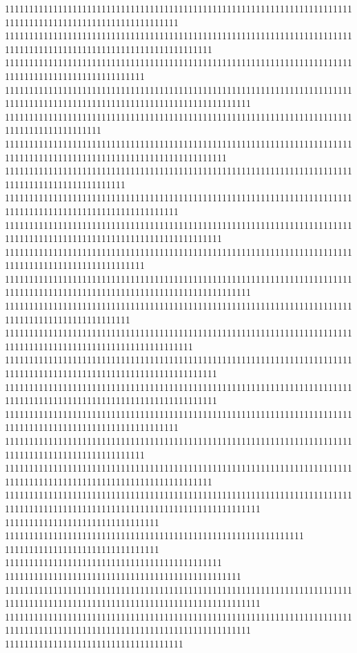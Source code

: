 111111111111111111111111111111111111111111111111111111111111111111111111111111111111111111111111111111111111
1111111111111111111111111111111111111111111111111111111111111111111111111111111111111111111111111111111111111111111
11111111111111111111111111111111111111111111111111111111111111111111111111111111111111111111111111111
111111111111111111111111111111111111111111111111111111111111111111111111111111111111111111111111111111111111111111111111111
11111111111111111111111111111111111111111111111111111111111111111111111111111111111111111111
1111111111111111111111111111111111111111111111111111111111111111111111111111111111111111111111111111111111111111111111
1111111111111111111111111111111111111111111111111111111111111111111111111111111111111111111111111
111111111111111111111111111111111111111111111111111111111111111111111111111111111111111111111111111111111111
111111111111111111111111111111111111111111111111111111111111111111111111111111111111111111111111111111111111111111111
11111111111111111111111111111111111111111111111111111111111111111111111111111111111111111111111111111
111111111111111111111111111111111111111111111111111111111111111111111111111111111111111111111111111111111111111111111111111
11111111111111111111111111111111111111111111111111111111111111111111111111111111111111111111111111
111111111111111111111111111111111111111111111111111111111111111111111111111111111111111111111111111111111111111
11111111111111111111111111111111111111111111111111111111111111111111111111111111111111111111111111111111111111111111
11111111111111111111111111111111111111111111111111111111111111111111111111111111111111111111111111111111111111111111
111111111111111111111111111111111111111111111111111111111111111111111111111111111111111111111111111111111111
11111111111111111111111111111111111111111111111111111111111111111111111111111111111111111111111111111
1111111111111111111111111111111111111111111111111111111111111111111111111111111111111111111111111111111111111111111
11111111111111111111111111111111111111111111111111111111111111111111111111111111111111111111111111111111111111111111111111111
11111111111111111111111111111111
11111111111111111111111111111111111111111111111111111111111111
11111111111111111111111111111111
111111111111111111111111111111111111111111111
1111111111111111111111111111111111111111111111111
11111111111111111111111111111111111111111111111111111111111111111111111111111111111111111111111111111111111111111111111111111
111111111111111111111111111111111111111111111111111111111111111111111111111111111111111111111111111111111111111111111111111
1111111111111111111111111111111111111
